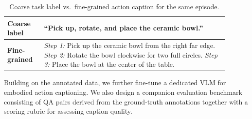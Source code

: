 \begin{table}[h]
\centering
\caption{Coarse task label vs.\ fine-grained action caption for the same episode.}
\label{tab:caption-example}
\setlength{\tabcolsep}{4pt}
\begin{tabular}{p{0.15\linewidth} p{0.75\linewidth}}
\toprule
\textbf{Coarse label} & ``Pick up, rotate, and place the ceramic bowl.'' \\
\midrule
\textbf{Fine-grained} &
  \textit{Step 1:} Pick up the ceramic bowl from the right far edge. \newline
  \textit{Step 2:} Rotate the bowl clockwise for two full circles. \newline
  \textit{Step 3:} Place the bowl at the center of the table. \\
\bottomrule
\end{tabular}
\end{table}

Building on the annotated data, we further fine-tune a dedicated VLM for
embodied action captioning. We also design a companion evaluation
benchmark consisting of QA pairs derived from the ground-truth
annotations together with a scoring rubric for assessing caption quality.

